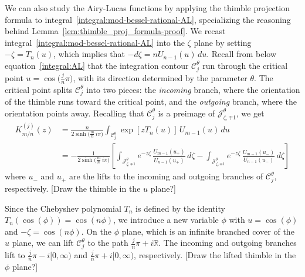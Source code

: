 \documentclass{article}
\newcommand{\R}{\mathbb{R}}
\theoremstyle{definition}
\theoremstyle{plain}
\newenvironment{todo}{\color{Coral}}{\color{black}}
\newenvironment{old}{\color{RoyalBlue}}{\color{black}}
\begin{document}
\begin{old}\par
We can also study the Airy-Lucas functions by applying the thimble projection formula to integral~\eqref{integral:mod-bessel-rational-AL}, specializing the reasoning behind Lemma~\ref{lem:thimble_proj_formula-proof}. We recast integral~\eqref{integral:mod-bessel-rational-AL} into the $\zeta$ plane by setting $-\zeta = T_n(u)$, which implies that $-d\zeta = n U_{n-1}(u)\,du$. Recall from below equation~\eqref{integral:AL} that the integration contour $\mathcal{C}^\theta_j$ run through the critical point $u = \cos\big(\tfrac{j}{n}\pi\big)$, with its direction determined by the parameter $\theta$. The critical point splits $\mathcal{C}^\theta_j$ into two pieces: the {\em incoming} branch, where the orientation of the thimble runs toward the critical point, and the {\em outgoing} branch, where the orientation points away. Recalling that $\mathcal{C}^\theta_j$ is a preimage of $\mathcal{J}^\theta_{\zeta, \mp 1}$, we get
\begin{align*}%
K^{(j)}_{m/n}(z) & = \frac{n}{2 \sinh\big(\tfrac{m}{n}\,i\pi\big)} \int_{\mathcal{C}^\theta_j} \exp\left[z T_n(u)\right]\,U_{m-1}(u)\,du \\
& = -\frac{1}{2\sinh\big(\tfrac{m}{n}\,i\pi\big)} \left[ \int_{\mathcal{J}^\theta_{\zeta, \mp 1}} e^{-z\zeta}\,\frac{U_{m-1}(u_+)}{U_{n-1}(u_+)}\,d\zeta - \int_{\mathcal{J}^\theta_{\zeta, \mp 1}} e^{-z\zeta}\,\frac{U_{m-1}(u_-)}{U_{n-1}(u_-)}\,d\zeta \right]
\end{align*}
where $u_-$ and $u_+$ are the lifts to the incoming and outgoing branches of $\mathcal{C}^\theta_j$, respectively. \begin{todo}[Draw the thimble in the $u$ plane?]\end{todo}

Since the Chebyshev polynomial $T_n$ is defined by the identity $T_n(\cos(\phi)) = \cos(n\phi)$, we introduce a new variable $\phi$ with $u = \cos(\phi)$ and $-\zeta = \cos(n\phi)$. On the $\phi$ plane, which is an infinite branched cover of the $u$ plane, we can lift $\mathcal{C}^\theta_j$ to the path $\tfrac{j}{n}\pi + i\R$. The incoming and outgoing branches lift to $\tfrac{j}{n}\pi - i[0, \infty)$ and $\tfrac{j}{n}\pi + i[0, \infty)$, respectively. \begin{todo}[Draw the lifted thimble in the $\phi$ plane?]\end{todo}


\end{old}
\end{document}

